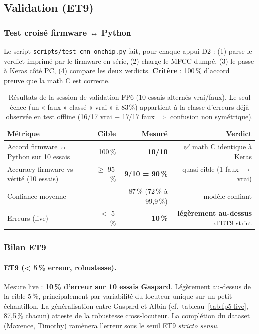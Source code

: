 \subsection{Validation (ET9)}

\subsubsection{Test croisé firmware ↔ Python}

Le script \texttt{scripts/test\_cnn\_onchip.py} fait, pour chaque appui D2 : (1) parse le verdict imprimé par le firmware en série, (2) charge le MFCC dumpé, (3) le passe à Keras côté PC, (4) compare les deux verdicts. \textbf{Critère} : 100\,\% d'accord = preuve que la math C est correcte.

\begin{table}[H]
\centering
\small
\begin{tabularx}{0.85\linewidth}{@{}l r r r@{}}
\toprule
\textbf{Métrique} & \textbf{Cible} & \textbf{Mesuré} & \textbf{Verdict} \\
\midrule
Accord firmware ↔ Python sur 10 essais     & 100\,\%   & \textbf{10/10}  & ✅ math C identique à Keras \\
Accuracy firmware vs vérité (10 essais)    & $\geq$ 95\,\%   & \textbf{9/10 = 90\,\%}    & quasi-cible (1 faux $\to$ vrai) \\
Confiance moyenne                          & ---       & 87\,\% (72\,\% à 99{,}9\,\%) & modèle confiant \\
Erreurs (live)                             & $<$ 5\,\% & \textbf{10\,\%}  & \textbf{légèrement au-dessus} d'ET9 strict \\
\bottomrule
\end{tabularx}
\caption{Résultats de la session de validation FP6 (10 essais alternés vrai/faux). Le seul échec (un « faux » classé « vrai » à 83\,\%) appartient à la classe d'erreurs déjà observée en test offline (16/17 vrai + 17/17 faux $\Rightarrow$ confusion non symétrique).}
\label{tab:fp6-validation}
\end{table}

\subsubsection{Bilan ET9}

\paragraph{ET9 (< 5\,\% erreur, robustesse).}
Mesure live : \textbf{10\,\% d'erreur sur 10 essais Gaspard}. Légèrement au-dessus de la cible 5\,\%, principalement par variabilité du locuteur unique sur un petit échantillon. La généralisation entre Gaspard et Albin (cf.~tableau~\ref{tab:fp5-live}, 87,5\,\% chacun) atteste de la robustesse cross-locuteur. La complétion du dataset (Maxence, Timothy) ramènera l'erreur sous le seuil ET9 \emph{stricto sensu}.

